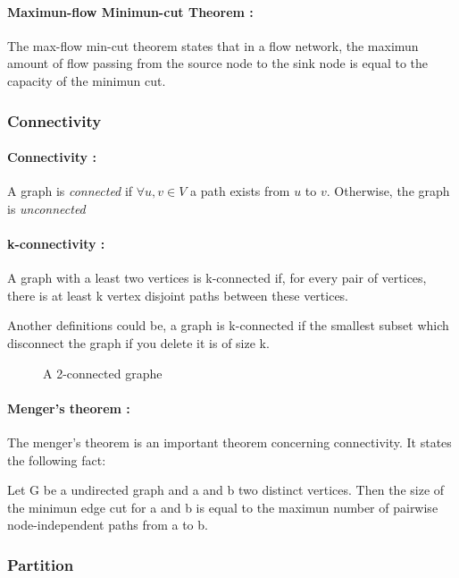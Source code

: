 \paragraph{Maximun-flow Minimun-cut Theorem :}
The max-flow min-cut theorem states that in a flow network, the maximun amount of flow passing from the source node to the sink node is equal to the capacity of the minimun cut.


\subsubsection{Connectivity}
\paragraph{Connectivity :}
A graph  is {\em connected} if $\forall u,v \in V$ a path exists from $u$
to $v$. Otherwise, the graph is {\em unconnected}

\paragraph{k-connectivity :}
A graph with a least two vertices is k-connected if, for every pair of vertices, there is at least k vertex disjoint paths between these vertices.

Another definitions could be, a graph is k-connected if the smallest subset which disconnect the graph if you delete it is of size k.

\begin{figure}[!h]
  \begin{center}
    
  \end{center}
  \caption{A 2-connected graphe}
\end{figure}

\paragraph{Menger's theorem :}
The menger's theorem is an important theorem concerning connectivity.
It states the following fact:

Let G be a undirected graph and a and b two distinct vertices.
Then the size of the minimun edge cut for a and b is equal to the maximun number of pairwise node-independent paths from a to b.


\subsubsection{Partition}
